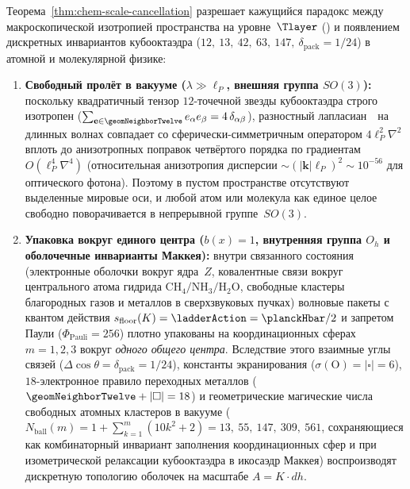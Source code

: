 \begin{corollary}
\label{cor:chem-so3-vs-oh-bound}
Теорема~\ref{thm:chem-scale-cancellation} разрешает кажущийся парадокс между макроскопической изотропией пространства на уровне~$\Tlayer$ () и появлением дискретных инвариантов кубооктаэдра ($12,\ 13,\ 42,\ 63,\ 147,\ \delta_{\mathrm{pack}}=1/24$) в атомной и молекулярной физике:
\begin{enumerate}[leftmargin=*,noitemsep]
\item \textbf{Свободный пролёт в вакууме ($\lambda \gg \ell_P$, внешняя группа $SO(3)$):}
  поскольку квадратичный тензор $12$-точечной звезды кубооктаэдра строго изотропен ($\sum_{\mathbf{e}\in\geomNeighborTwelve} e_\alpha e_\beta = 4\,\delta_{\alpha\beta}$), разностный лапласиан~\latGCKshort\ на длинных волнах совпадает со сферически-симметричным оператором $4\ell_P^2\nabla^2$ вплоть до анизотропных поправок четвёртого порядка по градиентам $O(\ell_P^4\nabla^4)$ (относительная анизотропия дисперсии $\sim (|\mathbf{k}|\ell_P)^2 \sim 10^{-56}$ для оптического фотона). Поэтому в пустом пространстве отсутствуют выделенные мировые оси, и любой атом или молекула как единое целое свободно поворачивается в непрерывной группе~$SO(3)$.
\item \textbf{Упаковка вокруг единого центра ($b(x)=1$, внутренняя группа $O_h$ и оболочечные инварианты Маккея):}
  внутри связанного состояния (электронные оболочки вокруг ядра~$Z$, ковалентные связи вокруг центрального атома гидрида $\text{CH}_4/\text{NH}_3/\text{H}_2\text{O}$, свободные кластеры благородных газов и металлов в сверхзвуковых пучках) волновые пакеты с квантом действия $s_{\mathrm{floor}}(K) = \ladderAction = \planckHbar/2$ и запретом Паули ($\Phi_{\mathrm{Pauli}}=256$) плотно упакованы на координационных сферах $m=1,2,3$ вокруг \emph{одного общего центра}. Вследствие этого взаимные углы связей ($\Delta\cos\theta = \delta_{\mathrm{pack}} = 1/24$), константы экранирования ($\sigma(\text{O}) = |\square| = 6$), $18$-электронное правило переходных металлов ($\geomNeighborTwelve + |\square| = 18$) и геометрические магические числа свободных атомных кластеров в вакууме ($N_{\mathrm{ball}}(m) = 1 + \sum_{k=1}^m(10k^2+2) = 13,\ 55,\ 147,\ 309,\ 561$, сохраняющиеся как комбинаторный инвариант заполнения координационных сфер и при изометрической релаксации кубооктаэдра в икосаэдр Маккея) воспроизводят дискретную топологию оболочек на масштабе $A = K\cdot dh$.
\end{enumerate}
\end{corollary}

